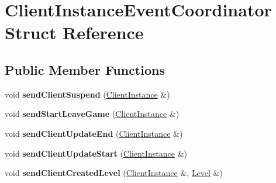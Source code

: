 \hypertarget{struct_client_instance_event_coordinator}{}\section{Client\+Instance\+Event\+Coordinator Struct Reference}
\label{struct_client_instance_event_coordinator}
\subsection*{Public Member Functions}
\begin{DoxyCompactItemize}
\item 
\mbox{\label{struct_client_instance_event_coordinator_a30c46b4e0a504a4ea6c70ab567a3d4a3}} 
void {\bfseries send\+Client\+Suspend} (\mbox{\hyperlink{struct_client_instance}{Client\+Instance}} \&)
\item 
\mbox{\label{struct_client_instance_event_coordinator_a90642986c20cb2c64d5e708b20d94c2c}} 
void {\bfseries send\+Start\+Leave\+Game} (\mbox{\hyperlink{struct_client_instance}{Client\+Instance}} \&)
\item 
\mbox{\label{struct_client_instance_event_coordinator_a7fd6f7fe77741c413a5237ad7c31dfa4}} 
void {\bfseries send\+Client\+Update\+End} (\mbox{\hyperlink{struct_client_instance}{Client\+Instance}} \&)
\item 
\mbox{\label{struct_client_instance_event_coordinator_ae7cffcbee61c19c7d436ce498695394f}} 
void {\bfseries send\+Client\+Update\+Start} (\mbox{\hyperlink{struct_client_instance}{Client\+Instance}} \&)
\item 
\mbox{\label{struct_client_instance_event_coordinator_a090f6a2790a7cc64b361caed8f7e6244}} 
void {\bfseries send\+Client\+Created\+Level} (\mbox{\hyperlink{struct_client_instance}{Client\+Instance}} \&, \mbox{\hyperlink{struct_level}{Level}} \&)
\item 
\mbox{\label{struct_client_instance_event_coordinator_aa4fb787b61d49eb8da55c6014b168d43}} 

\end{DoxyCompactItemize}
